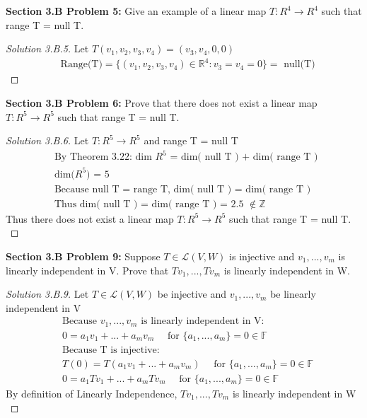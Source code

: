 \documentclass[12pt]{article}
\begin{document}
\newpage
\textbf{Section 3.B Problem 5: } Give an example of a linear map $T:R^4 \rightarrow R^4$ such that
range T = null T.

	\begin{proof}[Solution 3.B.5]
		Let $T(v_1,v_2,v_3,v_4) = (v_3,v_4,0,0)$ 
		\begin{align*}
			&\text{Range(T)} = \{(v_1,v_2,v_3,v_4) \in \mathbb{R}^4: v_3 = v_4 = 0\} = \text{ null(T)}			
		\end{align*}
	\end{proof}

\vspace{\baselineskip}
\textbf{Section 3.B Problem 6: } Prove that there does not exist a linear map $T: R^5 \rightarrow R^5$ such that range T = null T.
	
	\begin{proof}[Solution 3.B.6] 
		Let $T: R^5 \rightarrow R^5$ and range T = null T
		\begin{align*}
			&\text{By Theorem 3.22: dim $R^5$ = dim( null T ) + dim( range T ) } \\
			&\text{dim($R^5$) = 5} \\
			&\text{Because null T = range T, dim( null T ) = dim( range T ) } \\
			&\text{Thus dim( null T ) = dim( range T ) = 2.5 $\not \in \mathbb{Z}$}
		\end{align*}
		Thus there does not exist a linear map $T: R^5 \rightarrow R^5$ such that range T = null T. \\
	\end{proof}

\vspace{\baselineskip}
\textbf{Section 3.B Problem 9: } Suppose $T \in \mathcal{L}(V,W)$ is injective and $v_1,...,v_m$ is linearly independent
in V. Prove that $Tv_1,...,Tv_m$ is linearly independent in W.

	\begin{proof}[Solution 3.B.9]
		Let $T \in \mathcal{L}(V,W)$ be injective and $v_1,...,v_m$ be linearly independent in V
		\begin{align*}
			&\text{Because $v_1,...,v_m$ is linearly independent in V: } \\
			&0 = a_1v_1 + ... + a_mv_m \quad \text{ for } \{a_1,...,a_m\} = 0 \in \mathbb{F} \\
			&\text{Because T is injective: } \\
			&T(0) = T(a_1v_1 + ... + a_mv_m) \quad \text{ for } \{a_1,...,a_m\} = 0 \in \mathbb{F} \\
			&0 = a_1Tv_1 + ... + a_mTv_m \quad \text{ for } \{a_1,...,a_m\} = 0 \in \mathbb{F} 
		\end{align*}
		By definition of Linearly Independence, $Tv_1,...,Tv_m$ is linearly independent in W \\
	\end{proof}
\end{document}
